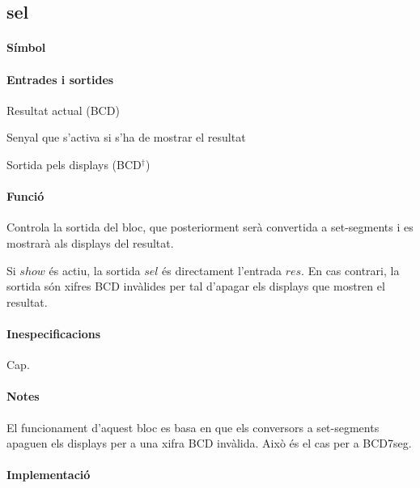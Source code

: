\subsection{\label{sub:\projectname-sel} \textsf{sel}}

\paragraph{Símbol}

\begin{center}  \end{center}

\paragraph{Entrades i sortides}

\begin{where}
\item[\nodenamerange{res}{7}{0}] Resultat actual (BCD)
\item[\nodenamebit{show}] Senyal que s'activa si s'ha de mostrar el resultat
\item[\nodenamerange{sel}{7}{0}] Sortida pels displays (BCD$^\dagger$)
\end{where}

\paragraph{Funció}

Controla la sortida del bloc, que posteriorment serà convertida a set-segments
i es mostrarà als displays del resultat.

Si $show$ és actiu, la sortida $sel$ és directament l'entrada $res$. En cas contrari,
la sortida són xifres BCD invàlides per tal d'apagar els displays que mostren
el resultat.

\paragraph{Inespecificacions}

Cap.

\paragraph{Notes}

El funcionament d'aquest bloc es basa en que els conversors a set-segments
apaguen els displays per a una xifra BCD invàlida. Això és el cas per a
\textsf{BCD7seg}.

\paragraph{Implementació}





\vspace{1cm}

